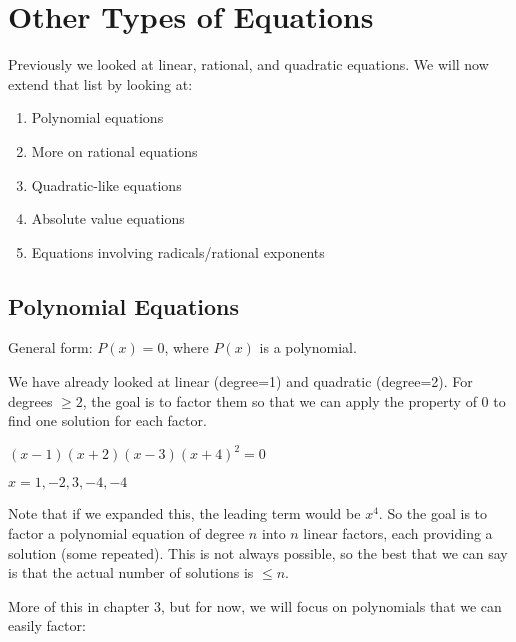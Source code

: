 \documentclass[letterpaper,12pt,fleqn]{article}
\begin{document}
\section*{Other Types of Equations}

Previously we looked at linear, rational, and quadratic equations. We will now
extend that list by looking at:
\begin{enumerate}
\item Polynomial equations
\item More on rational equations
\item Quadratic-like equations
\item Absolute value equations
\item Equations involving radicals/rational exponents
\end{enumerate}

\subsection*{Polynomial Equations}

General form: $P(x)=0$, where $P(x)$ is a polynomial.

We have already looked at linear (degree=1) and quadratic (degree=2). For
degrees $\ge2$, the goal is to factor them so that we can apply the property of
0 to find one solution for each factor.

\begin{example}
  $(x-1)(x+2)(x-3)(x+4)^2=0$
  
  $x=1,-2,3,-4,-4$

  Note that if we expanded this, the leading term would be $x^4$. So the goal
  is to factor a polynomial equation of degree $n$ into $n$ linear factors,
  each providing a solution (some repeated). This is not always possible, so
  the best that we can say is that the actual number of solutions is $\le n$.
\end{example}

More of this in chapter 3, but for now, we will focus on polynomials that we
can easily factor:
\end{document}
